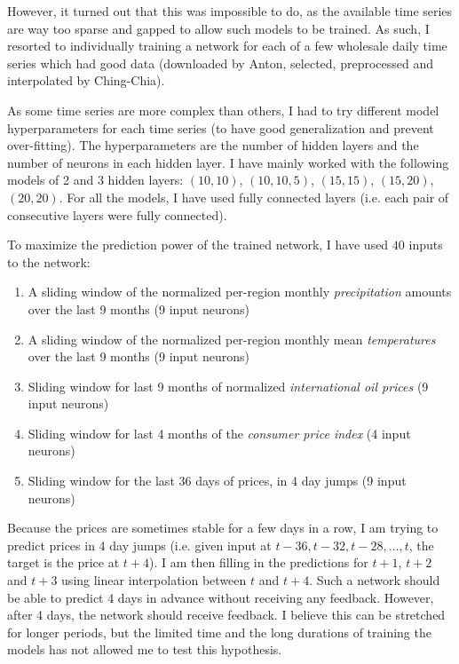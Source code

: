 However, it turned out that this was impossible to do, as the available time
series are way too sparse and gapped to allow such models to be trained.
As such, I resorted to individually training a network for each of a few
wholesale daily time series which had good data (downloaded by Anton, selected,
preprocessed and interpolated by Ching-Chia).

As some time series are more complex than others, I had to try different
model hyperparameters for each time series (to have good generalization and
prevent over-fitting). The hyperparameters are the number
of hidden layers and the number of neurons in each hidden layer. I have mainly
worked with the following models of 2 and 3 hidden layers: $(10, 10)$,
$(10, 10, 5)$, $(15, 15)$, $(15, 20)$, $(20, 20)$. For all the models, I have
used fully connected layers (i.e. each pair of consecutive layers were fully
connected).

To maximize the prediction power of the trained network, I have used $40$
inputs to the network:
\begin{enumerate}
    \item A sliding window of the normalized per-region monthly
        \emph{precipitation} amounts over the last 9 months (9 input neurons)
    \item A sliding window of the normalized per-region monthly mean
        \emph{temperatures} over the last 9 months (9 input neurons)
    \item Sliding window for last 9 months of normalized \emph{international
        oil prices} (9 input neurons)
    \item Sliding window for last 4 months of the \emph{consumer price index}
        (4 input neurons)
    \item Sliding window for the last 36 days of prices, in 4 day jumps (9
        input neurons)
\end{enumerate}

Because the prices are sometimes stable for a few days in a row, I am trying to
predict prices in 4 day jumps (i.e. given input at $t-36, t-32, t-28, \dots,
t$, the target is the price at $t+4$). I am then filling in the predictions for
$t+1$, $t+2$ and $t+3$ using linear interpolation between $t$ and $t+4$.
Such a network should be able to predict 4 days in advance without receiving
any feedback. However, after 4 days, the network should receive feedback. I
believe this can be stretched for longer periods, but the limited time and the
long durations of training the models has not allowed me to test this
hypothesis.


